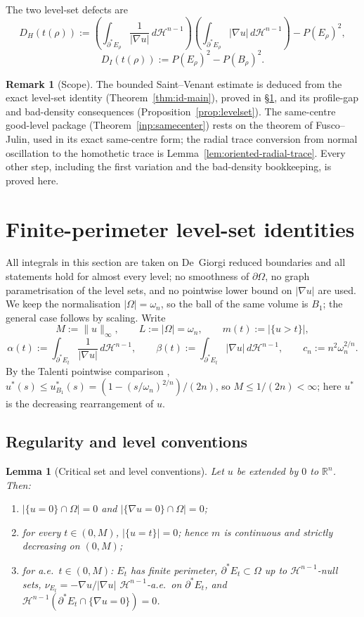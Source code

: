 \documentclass[11pt]{amsart}
\newtheorem{lemma}[theorem]{Lemma}
\theoremstyle{definition}
\newtheorem{remark}[theorem]{Remark}
\newcommand{\R}{\mathbb R}
\newcommand{\Om}{\Omega}
\newcommand{\Hn}{\mathcal H^{n-1}}
\newcommand{\Per}{P}
\begin{document}
The two level-set defects are
\[
   D_H(t(\rho))
   :=\left(\int_{\partial^*E_\rho}\frac1{|\nabla u|}\,d\Hn\right)
     \left(\int_{\partial^*E_\rho}|\nabla u|\,d\Hn\right)
      -\Per(E_\rho)^2,
\]
\[
   D_I(t(\rho)):=\Per(E_\rho)^2-\Per(B_\rho)^2 .
\]

\begin{remark}[Scope]\label{rem:scope}
The bounded Saint--Venant estimate is deduced from the exact level-set
identity (Theorem~\ref{thm:id-main}), proved in \S\ref{sec:identity}, and its
profile-gap and bad-density consequences (Proposition~\ref{prop:levelset}).
The same-centre good-level package (Theorem~\ref{inp:samecenter}) rests on the
theorem of Fusco--Julin, used in its exact same-centre form; the radial trace
conversion from normal oscillation to the homothetic trace is
Lemma~\ref{lem:oriented-radial-trace}.  Every other step, including the first
variation and the bad-density bookkeeping, is proved here.
\end{remark}

\section{Finite-perimeter level-set identities}\label{sec:identity}

All integrals in this section are taken on De~Giorgi reduced boundaries and all
statements hold for almost every level; no smoothness of \(\partial\Om\), no
graph parametrisation of the level sets, and no pointwise lower bound on
\(|\nabla u|\) are used.  We keep the normalisation \(|\Om|=\omega_n\), so the
ball of the same volume is \(B_1\); the general case follows by scaling.  Write
\[
   M:=\|u\|_\infty,\qquad L:=|\Om|=\omega_n,\qquad
   m(t):=|\{u>t\}|,
\]
\[
   \alpha(t):=\int_{\partial^*E_t}\frac1{|\nabla u|}\,d\Hn,\qquad
   \beta(t):=\int_{\partial^*E_t}|\nabla u|\,d\Hn,\qquad
   c_n:=n^2\omega_n^{2/n}.
\]
By the Talenti pointwise comparison \cite{Talenti1976},
\(u^*(s)\le u_{B_1}^*(s)=(1-(s/\omega_n)^{2/n})/(2n)\), so
\(M\le 1/(2n)<\infty\); here \(u^*\) is the decreasing rearrangement of \(u\).

\subsection*{Regularity and level conventions}

\begin{lemma}[Critical set and level conventions]\label{lem:id-noatoms}
Let \(u\) be extended by \(0\) to \(\R^n\).  Then:
\begin{enumerate}[label=\textup{(\alph*)},leftmargin=2.2em]
\item \(|\{u=0\}\cap\Om|=0\) and \(|\{\nabla u=0\}\cap\Om|=0\);
\item for every \(t\in(0,M)\), \(|\{u=t\}|=0\); hence \(m\) is continuous and
strictly decreasing on \((0,M)\);
\item for a.e.\ \(t\in(0,M)\): \(E_t\) has finite perimeter,
\(\partial^*E_t\subset\Om\) up to \(\Hn\)-null sets,
\(\nu_{E_t}=-\nabla u/|\nabla u|\) \(\Hn\)-a.e.\ on \(\partial^*E_t\), and
\(\Hn(\partial^*E_t\cap\{\nabla u=0\})=0\).
\end{enumerate}
\end{lemma}
\end{document}
